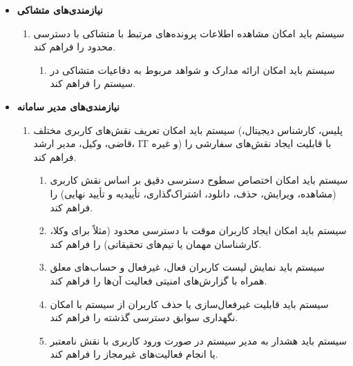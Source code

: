 \documentclass[12pt,a4paper,oneside]{article}
\begin{document}
\begin{itemize}
        \item
        \textbf{نیازمندی‌های متشاکی}
        \begin{enumerate}
            \renewcommand{\labelenumi}{\rl{{\arabic{enumi}}}R-}
            \setcounter{enumi}{9}
            \item 
            سیستم باید امکان مشاهده اطلاعات پرونده‌های مرتبط با متشاکی با دسترسی محدود را فراهم کند.
            \begin{enumerate}
                \renewcommand{\labelenumii}{{\rl{\arabic{enumii}.\arabic{enumi}}}R-}
                \item 
                سیستم باید امکان ارائه مدارک و شواهد مربوط به دفاعیات متشاکی در سیستم را فراهم کند.
            \end{enumerate}
        \end{enumerate}
    
        \item
        \textbf{نیازمندی‌های مدیر سامانه}
        \begin{enumerate}
            \renewcommand{\labelenumi}{\rl{{\arabic{enumi}}}R-}
            \setcounter{enumi}{11}
            \item 
            سیستم باید امکان تعریف نقش‌های کاربری مختلف (پلیس، کارشناس دیجیتال، قاضی، وکیل، مدیر ارشد، IT و غیره) با قابلیت ایجاد نقش‌های سفارشی را فراهم کند.
            \begin{enumerate}
                \renewcommand{\labelenumii}{{\rl{\arabic{enumii}.\arabic{enumi}}}R-}
                \item 
                سیستم باید امکان اختصاص سطوح دسترسی دقیق بر اساس نقش کاربری (مشاهده، ویرایش، حذف، دانلود، اشتراک‌گذاری، تأییدیه و تأیید نهایی) را فراهم کند.
                \item 
                سیستم باید امکان ایجاد کاربران موقت با دسترسی محدود (مثلاً برای وکلا، کارشناسان مهمان یا تیم‌های تحقیقاتی) را فراهم کند.
                \item 
                سیستم باید نمایش لیست کاربران فعال، غیرفعال و حساب‌های معلق همراه با گزارش‌های امنیتی فعالیت آن‌ها را فراهم کند.
                \item 
                سیستم باید قابلیت غیرفعال‌سازی یا حذف کاربران از سیستم با امکان نگهداری سوابق دسترسی گذشته را فراهم کند.
                \item 
                سیستم باید هشدار به مدیر سیستم در صورت ورود کاربری با نقش نامعتبر یا انجام فعالیت‌های غیرمجاز را فراهم کند.
            \end{enumerate}
    

\end{enumerate}
\end{itemize}
\end{document}
